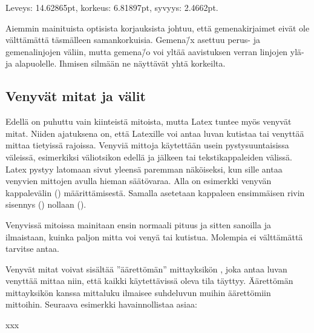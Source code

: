 \begin{tulossis}
  Leveys: 14.62865pt, korkeus: 6.81897pt, syvyys: 2.4662pt.
\end{tulossis}

Aiemmin mainituista optisista korjauksista johtuu, että gemenakirjaimet
eivät ole välttämättä täsmälleen samankorkuisia. Gemena\=/x asettuu
perus- ja gemenalinjojen väliin, mutta gemena\=/o voi yltää aavistuksen
verran linjojen ylä- ja alapuolelle. Ihmisen silmään ne näyttävät yhtä
korkeilta.

\subsection{Venyvät mitat ja välit}
\label{luku:venyvat_mitat}

Edellä on puhuttu vain kiinteistä mitoista, mutta Latex tuntee myös
venyvät mitat. Niiden ajatuksena on, että Latexille voi antaa luvan
kutistaa tai venyttää mittaa tietyissä rajoissa. Venyviä mittoja
käytettään usein pystysuuntaisissa väleissä, esimerkiksi väliotsikon
edellä ja jälkeen tai tekstikappaleiden välissä. Latex pystyy latomaan
sivut yleensä paremman näköiseksi, kun sille antaa venyvien mittojen
avulla hieman säätövaraa. Alla on esimerkki venyvän kappalevälin
() määrittämisestä. Samalla asetetaan kappaleen
ensimmäisen rivin sisennys () nollaan (\koodi{0em}).

\begin{koodilohkosis}
\setlength{\parskip}{2ex plus 0.2ex minus 0.1ex}
\setlength{\parindent}{0em}
\end{koodilohkosis}

Venyvissä mitoissa mainitaan ensin normaali pituus ja sitten sanoilla
 ja  ilmaistaan, kuinka paljon mitta voi venyä
tai kutistua. Molempia ei välttämättä tarvitse antaa.

Venyvät mitat voivat sisältää ''äärettömän'' mittayksikön ,
joka antaa luvan venyttää mittaa niin, että kaikki käytettävissä oleva
tila täyttyy. Äärettömän mittayksikön kanssa mittaluku ilmaisee
suhdeluvun muihin äärettömiin mittoihin. Seuraava esimerkki
havainnollistaa asiaa:

\begin{koodilohkosis}
x\hspace{0mm plus 1fill}x\hspace{0mm plus 2fill}x
\end{koodilohkosis}

